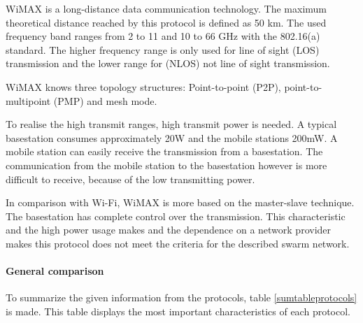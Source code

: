 \documentclass[10pt,a4paper]{article}
\begin{document}
WiMAX is a long-distance data communication technology. The maximum theoretical distance reached by this protocol is defined as 50 km. The used frequency band ranges from 2 to 11 and 10 to 66 GHz with the 802.16(a) standard. The higher frequency range is only used for line of sight (LOS) transmission and the lower range for (NLOS) not line of sight transmission.\cite{draadlozecommunicatie}

WiMAX knows three topology structures: Point-to-point (P2P), point-to-multipoint (PMP) and mesh mode. \cite{combook}

To realise the high transmit ranges, high transmit power is needed. A typical basestation consumes approximately 20W and the mobile stations 200mW. A mobile station can easily receive the transmission from a basestation. The communication from the mobile station to the basestation however is more difficult to receive, because of the low transmitting power.
\cite{wimax}

In comparison with Wi-Fi, WiMAX is more based on the master-slave technique. The basestation has complete control over the transmission. This characteristic and the high power usage makes and the dependence on a network provider makes this protocol does not meet the criteria for the described swarm network.\\

\paragraph{General comparison}
To summarize the given information from the protocols, table \ref{sumtableprotocols} is made. This table displays the most important characteristics of each protocol.
\end{document}
